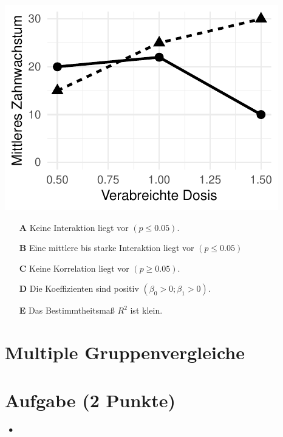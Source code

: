 \documentclass[a4paper, 9pt]{scrartcl}\usepackage[]{graphicx}\usepackage[]{xcolor}
\makeatletter
\def\maxwidth{ %
  \ifdim\Gin@nat@width>\linewidth
    \linewidth
  \else
    \Gin@nat@width
  \fi
}
\makeatother
\begin{document}
{\centering \includegraphics[width=\maxwidth]{img/mc-anova-02-a-1} 

}







\begin{enumerate}
\item [\textbf{A} \msquare] Keine Interaktion liegt vor $(p \leq 0.05)$.
\item [\textbf{B} \msquare] Eine mittlere bis starke Interaktion liegt vor $(p \leq 0.05)$
\item [\textbf{C} \msquare] Keine Korrelation liegt vor $(p \geq 0.05)$.
\item [\textbf{D} \msquare] Die Koeffizienten sind positiv $(\beta_0 > 0; \beta_1 > 0)$.
\item [\textbf{E} \msquare] Das Bestimmtheitsmaß $R^2$ ist klein.
\end{enumerate}
\section*{Multiple Gruppenvergleiche} 

\section{Aufgabe \hfill (2 Punkte)}

\ifcollection
\begin{flushright}
\tiny\vspace{-2Ex}
\textbf{\examinhaltstart}
\exammodulestatversuch $\;\bullet$
\exammodulebiostat
\vspace{-1Ex}
\end{flushright}
\fi
\end{document}

